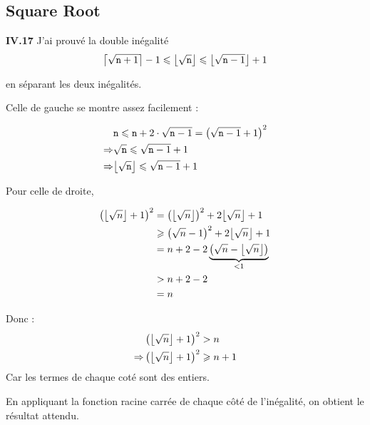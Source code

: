 \documentclass[9pt,a4paper,twocolumn]{article}
\theoremstyle{definition}
\DeclarePairedDelimiter\ceil{\lceil}{\rceil}
\DeclarePairedDelimiter\floor{\lfloor}{\rfloor}
\renewcommand{\leq}{\leqslant}
\renewcommand{\geq}{\geqslant}
\newenvironment{code}[1][ocaml]{%
\newgeometry{textwidth = 0.8\textwidth}
\VerbatimEnvironment\begin{verbatim}%
}{%
\end{verbatim}
\restoregeometry
}
\begin{document}
\subsection{Square Root}


\textbf{IV.17}
J'ai prouvé la double inégalité
\begin{equation}
\ceil*{\sqrt{\texttt{n}+1}} -1
\leq \floor*{\sqrt{\texttt{n}}}
\leq \floor*{\sqrt{\texttt{n}-1}}+1
\label{eq:sqrt}
\end{equation}

en séparant les deux inégalités.

Celle de gauche se montre assez facilement :

\begin{align*}
   &\texttt{n} \leq \texttt{n} +2\cdot\sqrt{\texttt{n}-1}
      =\left(\sqrt{\texttt{n}-1}+1\right)^2\\
\Rightarrow
    &\sqrt{ \texttt{n} } \leq \sqrt{\texttt{n}-1}+1 \\
 \Rightarrow
        &\floor*{\sqrt{ \texttt{n} }} \leq \sqrt{\texttt{n}-1}+1 \\
\end{align*}

Pour celle de droite,

\begin{align*}
   \left(\floor*{\sqrt{n}}+1 \right)^2
   &=\left(\floor*{\sqrt{n}}\right)^2 + 2\floor*{\sqrt{n}} +1
\\   &\geq \left(\sqrt{n} -1 \right)^2 + 2\floor*{\sqrt{n}} +1
\\   &= n + 2 -2
      \underbrace{\left(\sqrt{ n }- \floor*{\sqrt{ n }}\right)}_{< 1}
\\   &> n + 2 -2
\\   &= n
\end{align*}

Donc :
\begin{align*}
   &\left(\floor*{\sqrt{n}}+1 \right)^2 > n
\\   \Rightarrow
   &\left(\floor*{\sqrt{n}}+1 \right)^2 \geq n+1
\end{align*}
Car les termes de chaque coté sont des entiers.

En appliquant la fonction racine carrée de chaque côté de l'inégalité,
on obtient le résultat attendu.
\end{document}
